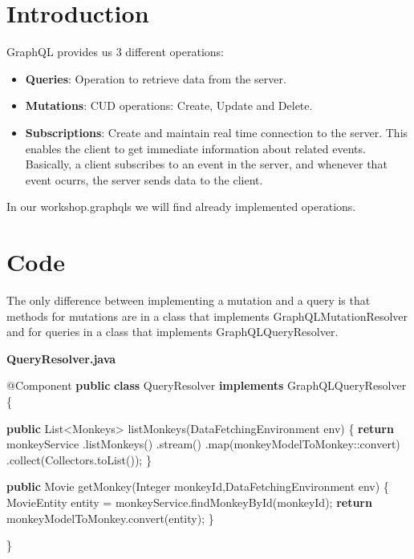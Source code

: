 \documentclass[]{book}
\newenvironment{Shaded}{\begin{snugshade}}{\end{snugshade}}
\newcommand{\KeywordTok}[1]{\textcolor[rgb]{0.13,0.29,0.53}{\textbf{#1}}}
\newcommand{\FunctionTok}[1]{\textcolor[rgb]{0.00,0.00,0.00}{#1}}
\newcommand{\BuiltInTok}[1]{#1}
\newcommand{\AttributeTok}[1]{\textcolor[rgb]{0.77,0.63,0.00}{#1}}
\newcommand{\NormalTok}[1]{#1}
\providecommand{\tightlist}{%
  \setlength{\itemsep}{0pt}\setlength{\parskip}{0pt}}
\begin{document}
\section{Introduction}\label{introduction-2}

GraphQL provides us 3 different operations:

\begin{itemize}
\tightlist
\item
  \textbf{Queries}: Operation to retrieve data from the server.
\item
  \textbf{Mutations}: CUD operations: Create, Update and Delete.
\item
  \textbf{Subscriptions}: Create and maintain real time connection to
  the server. This enables the client to get immediate information about
  related events. Basically, a client subscribes to an event in the
  server, and whenever that event ocurrs, the server sends data to the
  client.
\end{itemize}

In our workshop.graphqls we will find already implemented operations.

\section{Code}\label{code-1}

The only difference between implementing a mutation and a query is that
methods for mutations are in a class that implements
GraphQLMutationResolver and for queries in a class that implements
GraphQLQueryResolver.

\textbf{QueryResolver.java}

\begin{Shaded}
\begin{Highlighting}[]
\AttributeTok{@Component}
\KeywordTok{public} \KeywordTok{class}\NormalTok{ QueryResolver }\KeywordTok{implements}\NormalTok{ GraphQLQueryResolver \{}
    
    \KeywordTok{public} \BuiltInTok{List}\NormalTok{<Monkeys> }\FunctionTok{listMonkeys}\NormalTok{(DataFetchingEnvironment env) \{}
        \KeywordTok{return}\NormalTok{ monkeyService}
\NormalTok{            .}\FunctionTok{listMonkeys}\NormalTok{()}
\NormalTok{            .}\FunctionTok{stream}\NormalTok{()}
\NormalTok{            .}\FunctionTok{map}\NormalTok{(monkeyModelToMonkey::convert)}
\NormalTok{            .}\FunctionTok{collect}\NormalTok{(Collectors.}\FunctionTok{toList}\NormalTok{());}
\NormalTok{    \}}
        
    \KeywordTok{public}\NormalTok{ Movie }\FunctionTok{getMonkey}\NormalTok{(}\BuiltInTok{Integer}\NormalTok{ monkeyId,DataFetchingEnvironment env) \{}
\NormalTok{        MovieEntity entity = monkeyService.}\FunctionTok{findMonkeyById}\NormalTok{(monkeyId);}
        \KeywordTok{return}\NormalTok{ monkeyModelToMonkey.}\FunctionTok{convert}\NormalTok{(entity);}
\NormalTok{    \}}
        
\NormalTok{\}}
\end{Highlighting}
\end{Shaded}
\end{document}
